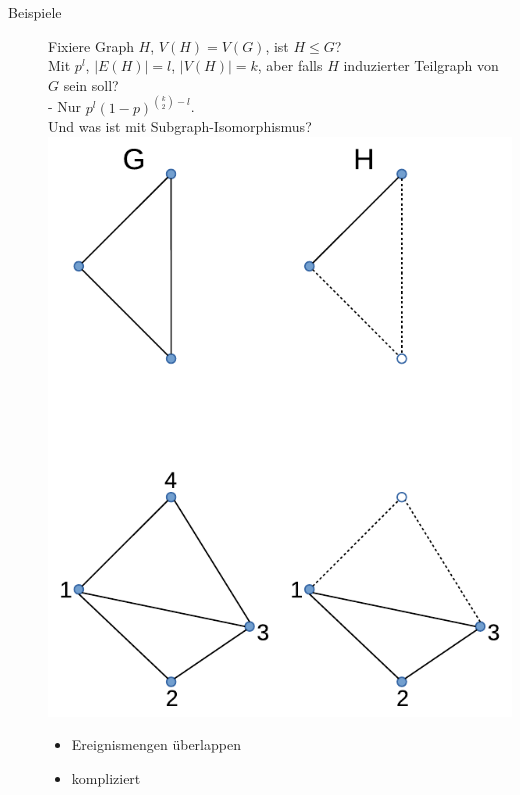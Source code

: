 \begin{description}
    \item[Beispiele] Fixiere Graph $H$, $V(H) = V(G)$, ist $H \leqslant G$? \\
        Mit $p^l$, $|E(H)| = l$, $|V(H)| = k$, aber falls $H$ induzierter Teilgraph von $G$ sein soll? \\
         - Nur $p^l (1-p)^{\binom{k}{2} - l}$. \\
        Und was ist mit Subgraph-Isomorphismus?
        \includegraphics[scale=0.5]{lectures/161125/pix/4.pdf}
        \begin{itemize}
            \item Ereignismengen überlappen
            \item kompliziert
        \end{itemize}
\end{description}

